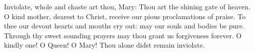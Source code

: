 \begin{enpars}
\noindent
Inviolate, whole and chaste art thou, Mary:
Thou art the shining gate of heaven.
O kind mother, dearest to Christ,
receive our pious proclamations of praise.
To thee our devout hearts and mouths cry out:
may our souls and bodies be pure.
Through thy sweet sounding prayers
may thou grant us forgiveness forever.
O kindly one! O Queen! O Mary!
Thou alone didst remain inviolate.\end{enpars}